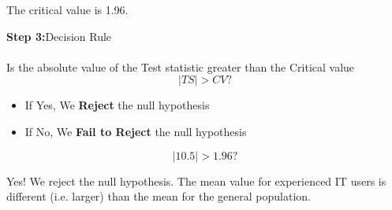 \documentclass[a4paper,12pt]{article}
\begin{document}
The critical value is 1.96.

\noindent \textbf{Step 3:}Decision Rule\\\\

Is the absolute value of the Test statistic greater than the Critical value
\[ |TS| >CV? \]

\begin{itemize}
\item If Yes, We \textbf{Reject} the null hypothesis
\item If No, We \textbf{Fail to Reject} the null hypothesis
\end{itemize}

\[ |10.5| >1.96? \]

Yes! We reject the null hypothesis. The mean value for experienced IT users is different (i.e. larger) than the mean for the general population.
\end{document}
